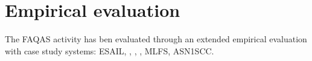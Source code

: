 

\section{Empirical evaluation}
\label{sec:summary:results}

The FAQAS activity has ben evaluated through an extended empirical evaluation with  case study systems:
ESAIL, \GCSP{}, \PARAM{}, \UTIL{}, MLFS, ASN1SCC.
 
%
%
%
%


